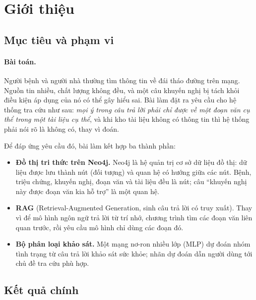 \documentclass[11pt,a4paper]{article}
\begin{document}
\newpage
\tableofcontents
\newpage

\section{Giới thiệu}

\subsection{Mục tiêu và phạm vi}

\paragraph{Bài toán.}
Người bệnh và người nhà thường tìm thông tin về đái tháo đường trên mạng. Nguồn tin nhiều, chất lượng không
đều, và một câu khuyến nghị bị tách khỏi điều kiện áp dụng của nó có thể gây hiểu sai. Bài làm đặt ra yêu cầu
cho hệ thống tra cứu như sau: \emph{mọi ý trong câu trả lời phải chỉ được về một đoạn văn cụ thể trong một tài liệu
cụ thể}, và khi kho tài liệu không có thông tin thì hệ thống phải nói rõ là không có, thay vì đoán.

Để đáp ứng yêu cầu đó, bài làm kết hợp ba thành phần:
\begin{itemize}
  \item \textbf{Đồ thị tri thức trên Neo4j.} Neo4j là hệ quản trị cơ sở dữ liệu đồ thị: dữ liệu được lưu thành
        nút (đối tượng) và quan hệ có hướng giữa các nút. Bệnh, triệu chứng, khuyến nghị, đoạn văn và tài liệu đều
        là nút; câu “khuyến nghị này được đoạn văn kia hỗ trợ” là một quan hệ.
  \item \textbf{RAG} (Retrieval-Augmented Generation, sinh câu trả lời có truy xuất). Thay vì để mô hình ngôn ngữ
        trả lời từ trí nhớ, chương trình tìm các đoạn văn liên quan trước, rồi yêu cầu mô hình chỉ dùng các đoạn đó.
  \item \textbf{Bộ phân loại khảo sát.} Một mạng nơ-ron nhiều lớp (MLP) dự đoán nhóm tình trạng từ câu trả lời khảo
        sát sức khỏe; nhãn dự đoán dẫn người dùng tới chủ đề tra cứu phù hợp.
\end{itemize}

\subsection{Kết quả chính}

\begin{center}
\end{center}
\end{document}
